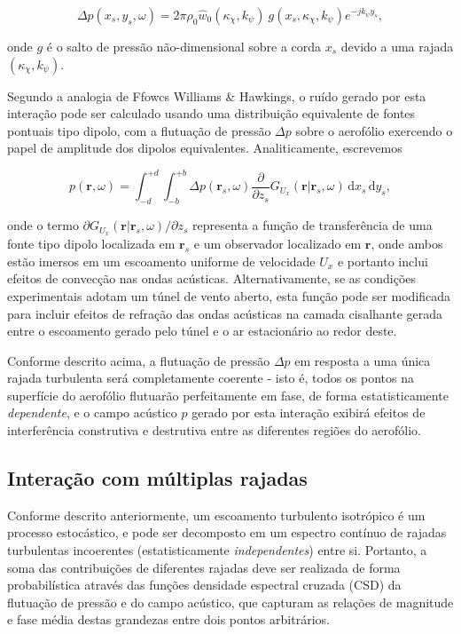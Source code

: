 \documentclass[a4paper, 11pt, twoside]{article}
\newcommand{\ud}{\,\mathrm{d}}
\begin{document}
\begin{equation}
\Delta p(x_s, y_s, \omega) =  2 \pi \rho_0 \hat{w}_0(\kappa_\chi, k_\psi) \ g(x_s, \kappa_\chi, k_\psi) e^{-j k_\psi y_s},
\label{eq:DeltaP_SingleGust}
\end{equation}

\noindent onde $g$ é o salto de pressão não-dimensional sobre a corda $x_s$ devido a uma rajada $(\kappa_\chi, k_\psi)$.

Segundo a analogia de Ffowcs Williams \& Hawkings, o ruído gerado por esta interação pode ser calculado usando uma distribuição equivalente de fontes pontuais tipo dipolo, com a flutuação de pressão $\Delta p$ sobre o aerofólio exercendo o papel de amplitude dos dipolos equivalentes. Analiticamente, escrevemos

\begin{equation}
	p(\mathbf{r}, \omega) = \int_{-d}^{+d} \int_{-b}^{+b} \Delta p(\mathbf{r}_s, \omega) \frac{\partial }{\partial z_s} G_{U_x}(\mathbf{r} | \mathbf{r}_s, \omega) \ud x_s \ud y_s,
\end{equation}

\noindent onde o termo $\partial G_{U_x}(\mathbf{r} | \mathbf{r}_s, \omega) / \partial z_s$ representa a função de transferência de uma fonte tipo dipolo localizada em $\mathbf{r}_s$ e um observador localizado em $\mathbf{r}$, onde ambos estão imersos em um escoamento uniforme de velocidade $U_x$ e portanto inclui efeitos de convecção nas ondas acústicas. Alternativamente, se as condições experimentais adotam um túnel de vento aberto, esta função pode ser modificada para incluir efeitos de refração das ondas acústicas na camada cisalhante gerada entre o escoamento gerado pelo túnel e o ar estacionário ao redor deste.

Conforme descrito acima, a flutuação de pressão $\Delta p$ em resposta a uma única rajada turbulenta será completamente coerente - isto é, todos os pontos na superfície do aerofólio flutuarão perfeitamente em fase, de forma estatisticamente \emph{dependente}, e o campo acústico $p$ gerado por esta interação exibirá efeitos de interferência construtiva e destrutiva entre as diferentes regiões do aerofólio.

\subsection{Interação com múltiplas rajadas}

Conforme descrito anteriormente, um escoamento turbulento isotrópico é um processo estocástico, e pode ser decomposto em um espectro contínuo de rajadas turbulentas incoerentes (estatisticamente \emph{independentes}) entre si. Portanto, a soma das contribuições de diferentes rajadas deve ser realizada de forma probabilística através das funções densidade espectral cruzada (CSD) da flutuação de pressão e do campo acústico, que capturam as relações de magnitude e fase média destas grandezas entre dois pontos arbitrários.
\end{document}
